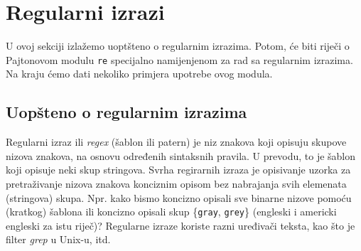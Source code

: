 \section{Regularni izrazi}

U ovoj sekciji izlažemo uoptšteno o regularnim izrazima. Potom, će biti riječi o Pajtonovom modulu \texttt{re} specijalno namijenjenom za rad sa regularnim izrazima. Na kraju ćemo dati nekoliko primjera upotrebe ovog modula. 

\subsection{Uopšteno o regularnim izrazima}

Regularni izraz ili \textit{regex} (šablon ili patern) je niz znakova koji opisuju skupove nizova znakova, na osnovu određenih sintaksnih pravila. U prevodu, to je šablon koji opisuje neki skup stringova.  Svrha regirarnih izraza je opisivanje uzorka za pretraživanje nizova znakova konciznim opisom bez nabrajanja svih elemenata (stringova) skupa. Npr. kako bismo koncizno opisali sve binarne nizove
pomoću (kratkog) šablona ili koncizno opisali skup \{\texttt{gray}, \texttt{grey}\} (engleski i
americki engleski za istu riječ)? Regularne izraze koriste razni uređivači teksta, kao što je filter \textit{grep} u Unix-u, itd. \\

